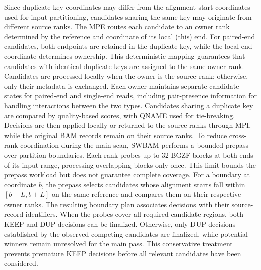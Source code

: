 \documentclass[lettersize,journal]{IEEEtran}
\begin{document}
Since duplicate-key coordinates may differ from the alignment-start coordinates used for input partitioning, candidates sharing the same key may originate from different source ranks. 
The MPE routes each candidate to an owner rank determined by the reference and coordinate of its local (this) end. 
For paired-end candidates, both endpoints are retained in the duplicate key, while the local-end coordinate determines ownership. 
This deterministic mapping guarantees that candidates with identical duplicate keys are assigned to the same owner rank. Candidates are processed locally when the owner is the source rank; otherwise, only their metadata is exchanged. 
Each owner maintains separate candidate states for paired-end and single-end reads, including pair-presence information for handling interactions between the two types.
Candidates sharing a duplicate key are compared by quality-based scores, with QNAME used for tie-breaking. 
Decisions are then applied locally or returned to the source ranks through MPI, while the original BAM records remain on their source ranks. 
To reduce cross-rank coordination during the main scan, SWBAM performs a bounded prepass over partition boundaries. Each rank probes up to 32 BGZF blocks at both ends of its input range, processing overlapping blocks only once. 
This limit bounds the prepass workload but does not guarantee complete coverage. 
For a boundary at coordinate $b$, the prepass selects candidates whose alignment starts fall within $[b-L,b+L]$ on the same reference and compares them on their respective owner ranks. 
The resulting boundary plan associates decisions with their source-record identifiers. When the probes cover all required candidate regions, both KEEP and DUP decisions can be finalized. 
Otherwise, only DUP decisions established by the observed competing candidates are finalized, while potential winners remain unresolved for the main pass. 
This conservative treatment prevents premature KEEP decisions before all relevant candidates have been considered.
\end{document}
